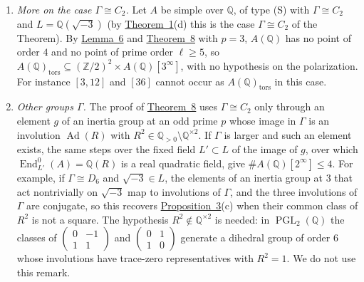 \documentclass[11pt]{article}
\newcommand{\Q}{\mathbb Q}
\newcommand{\Z}{\mathbb Z}
\DeclareMathOperator{\End}{End}
\DeclareMathOperator{\PGL}{PGL}
\DeclareMathOperator{\Ad}{Ad}
\begin{document}
\begin{enumerate}
\item\label{rem-more} \emph{More on the case \(\Gamma\cong C_2\).} Let \(A\) be simple over \(\Q\), of type (S)
with \(\Gamma\cong C_2\) and \(L=\Q(\sqrt{-3})\) (by \hyperref[thm-full3]{Theorem~1}(d) this is the case
\(\Gamma\cong C_2\) of the Theorem). By \hyperref[lemma-rm]{Lemma~6} and \hyperref[thm-inertia]{Theorem~8} with
\(p=3\), \(A(\Q)\) has no point of order \(4\) and no point of prime order \(\ell\ge5\), so
\(A(\Q)_{\mathrm{tors}}\subseteq(\Z/2)^2\times A(\Q)[3^\infty]\), with no hypothesis on the polarization. For
instance \([3,12]\) and \([36]\) cannot occur as \(A(\Q)_{\mathrm{tors}}\) in this case.

\item\label{rem-gamma} \emph{Other groups \(\Gamma\).} The proof of \hyperref[thm-inertia]{Theorem~8} uses
\(\Gamma\cong C_2\) only through an element \(g\) of an inertia group at an odd prime \(p\) whose image in \(\Gamma\)
is an involution \(\Ad(R)\) with \(R^2\in\Q_{>0}\setminus\Q^{\times2}\). If \(\Gamma\) is larger and such an
element exists, the same steps over the fixed field \(L'\subset L\) of the image of \(g\), over which
\(\End^0_{L'}(A)=\Q(R)\) is a real quadratic field, give \(\#A(\Q)[2^\infty]\le4\). For example, if
\(\Gamma\cong D_6\) and \(\sqrt{-3}\in L\), the elements of an inertia group at \(3\) that act nontrivially on
\(\sqrt{-3}\) map to involutions of \(\Gamma\), and the three involutions of \(\Gamma\) are conjugate, so this recovers
\hyperref[prop-ord3]{Proposition~3}(c) when their common class of \(R^2\) is not a square. The hypothesis
\(R^2\notin\Q^{\times2}\) is needed: in \(\PGL_2(\Q)\) the classes of
\(\left(\begin{smallmatrix}0&-1\\1&1\end{smallmatrix}\right)\) and
\(\left(\begin{smallmatrix}0&1\\1&0\end{smallmatrix}\right)\) generate a dihedral group of order \(6\) whose
involutions have trace-zero representatives with \(R^2=1\). We do not use this remark.


\end{enumerate}
\end{document}
